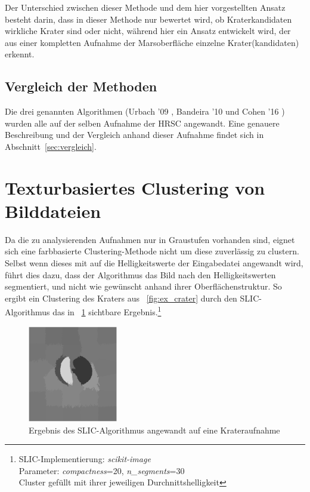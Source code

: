 Der Unterschied zwischen dieser Methode und dem hier vorgestellten Ansatz besteht darin, dass in dieser Methode nur bewertet wird, ob Kraterkandidaten wirkliche Krater sind oder nicht, während hier ein Ansatz entwickelt wird, der aus einer kompletten Aufnahme der Marsoberfläche einzelne Krater(kandidaten) erkennt.

\subsection{Vergleich der Methoden}
\label{ssec:vergleich}

Die drei genannten Algorithmen (Urbach '09 \cite{urbach_stepinski_2009}, Bandeira '10 \cite{bandeira_10} und Cohen '16 \cite{cohen_16}) wurden alle auf der selben Aufnahme der HRSC angewandt. Eine genauere Beschreibung und der Vergleich anhand dieser Aufnahme findet sich in Abschnitt~\ref{sec:vergleich}.

\section{Texturbasiertes Clustering von Bilddateien}
\label{sec:clustering}

Da die zu analysierenden Aufnahmen nur in Graustufen vorhanden sind, eignet sich eine farbbasierte Clustering-Methode nicht um diese zuverlässig zu clustern. Selbst wenn dieses mit auf die Helligkeitswerte der Eingabedatei angewandt wird, führt dies dazu, dass der Algorithmus das Bild nach den Helligkeitswerten segmentiert, und nicht wie gewünscht anhand ihrer Oberflächenstruktur. So ergibt ein Clustering des Kraters aus \figurename~\ref{fig:ex_crater} durch den SLIC-Algorithmus \cite{achanta_10} das in \figurename~\ref{fig:slic_crater} sichtbare Ergebnis.\footnote{SLIC-Implementierung: \textit{scikit-image}\\Parameter: \textit{compactness}=20, \textit{n\_segments}=30\\Cluster gefüllt mit ihrer jeweiligen Durchnittshelligkeit}

\begin{figure}[h!]
	\centering
	\includegraphics[width=0.35\textwidth,keepaspectratio]{images/gen/GEN_slic_crater.png}
	\captionsetup{format=plain,width=0.35\textwidth}
	\caption{Ergebnis des SLIC-Algorithmus angewandt auf eine Krateraufnahme}
	\label{fig:slic_crater}
\end{figure}

